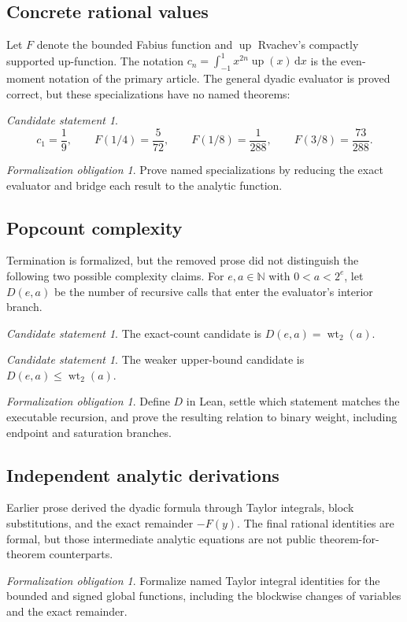 \documentclass[11pt,oneside]{article}
\theoremstyle{definition}
\theoremstyle{remark}
\newcommand{\N}{\mathbb N}
\newcommand{\Up}{\operatorname{up}}
\newcommand{\wt}{\operatorname{wt}_2}
\newcommand{\dd}{\,\mathrm d}
\newtheorem{candidate}[theorem]{Candidate statement}
\newtheorem{obligation}[theorem]{Formalization obligation}
\begin{document}
\subsection{Concrete rational values}

Let \(F\) denote the bounded Fabius function and \(\Up\) Rvachev's compactly supported
up-function.  The notation
\(c_n=\int_{-1}^{1}x^{2n}\Up(x)\dd x\) is the even-moment notation of the primary article.
The general dyadic evaluator is proved correct, but these specializations have no named
theorems:
\begin{candidate}
\[
 c_1=\frac19,\qquad
 F(1/4)=\frac5{72},\qquad
 F(1/8)=\frac1{288},\qquad
 F(3/8)=\frac{73}{288}.
\]
\end{candidate}
\begin{obligation}
Prove named specializations by reducing the exact evaluator and bridge each result to the
analytic function.
\end{obligation}

\subsection{Popcount complexity}

Termination is formalized, but the removed prose did not distinguish the following two
possible complexity claims.  For \(e,a\in\N\) with \(0<a<2^e\), let \(D(e,a)\) be the
number of recursive calls that enter the evaluator's interior branch.
\begin{candidate}
The exact-count candidate is \(D(e,a)=\wt(a)\).
\end{candidate}
\begin{candidate}
The weaker upper-bound candidate is \(D(e,a)\le\wt(a)\).
\end{candidate}
\begin{obligation}
Define \(D\) in Lean, settle which statement matches the executable recursion, and prove
the resulting relation to binary weight, including endpoint and saturation branches.
\end{obligation}

\subsection{Independent analytic derivations}

Earlier prose derived the dyadic formula through Taylor integrals, block substitutions,
and the exact remainder \(-F(y)\).  The final rational identities are formal, but those
intermediate analytic equations are not public theorem-for-theorem counterparts.
\begin{obligation}
Formalize named Taylor integral identities for the bounded and signed global functions,
including the blockwise changes of variables and the exact remainder.
\end{obligation}
\end{document}
